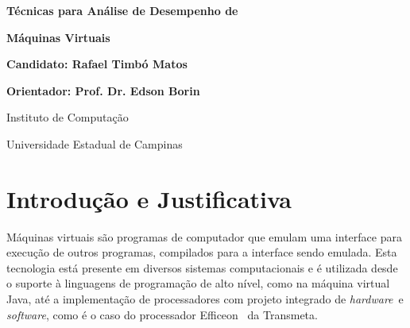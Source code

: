 \documentclass[a4paper,12pt]{article}
\def\candidato{Rafael Timbó Matos}
\def\orientador{Prof. Dr. Edson Borin}
\newcommand{\software}{\emph{software}}
\newcommand{\hardware}{\emph{hardware}}
\newcommand{\benchmarks}{\emph{benchmarks}}
\begin{document}
\thispagestyle{empty}
\bigskip
\bigskip
\centerline{\LARGE\bf Técnicas para Análise de Desempenho de}
\centerline{\LARGE\bf Máquinas Virtuais}
\bigskip\bigskip
\centerline{\large\bf Candidato: \candidato}
\centerline{\large\bf Orientador: \orientador}
\bigskip\bigskip
\centerline{\large Instituto de Computação}
\centerline{\large Universidade Estadual de Campinas}
\bigskip
\def\abstractname{\normalsize Resumo}

\begin{abstract}\normalsize

A análise de desempenho de processadores tem sido realizada através da execução
de conjuntos de aplicações denominados \benchmarks. Da mesma forma, a comunidade
científica tipicamente emprega o uso dos mesmos \benchmarks\ para avaliar o
desempenho de Máquinas Virtuais. Entretanto, resultados de pesquisas
recentes~\cite{divino2012wish} indicam que os \benchmarks\ tipicamente
utilizados para avaliação de processadores (SPEC CPU) podem mascarar a
sobrecarga das técnicas de emulação quando utilizados para avaliar máquinas
virtuais. Assim sendo, este trabalho propõe um levantamento de
\benchmarks\ voltados para a análise de máquinas virtuais e a construção de um
banco de dados para armazenar resultados de experimentos. Tais
\benchmarks\ possibilitarão a avaliação e o desenvolvimento de técnicas de
emulação em máquinas virtuais e o estudo de técnicas eficientes de
interpretação, considerando adequadamente a sobrecarga das técnicas de emulação.
\end{abstract}


\section{Introdução e Justificativa}
\label{sec:intro}
Máquinas virtuais são programas de computador que emulam uma interface para
execução de outros programas, compilados para a interface sendo emulada. Esta
tecnologia está presente em diversos sistemas computacionais e é utilizada desde
o suporte à linguagens de programação de alto nível, como na máquina virtual
Java, até a implementação de processadores com projeto integrado de \hardware\ e
\software, como é o caso do processador Efficeon~\cite{Kre03} da Transmeta.
\end{document}
